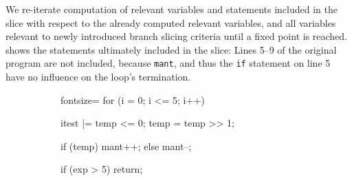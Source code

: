 \begin{example}
We re-iterate computation of relevant variables and statements included in the slice with respect to the already computed relevant variables, and all variables relevant to newly introduced branch slicing criteria until a fixed point is reached.  shows the statements ultimately included in the slice: Lines 5--9 of the original program are not included, because \texttt{mant}, and thus the \texttt{if} statement on line 5 have no influence on the loop's termination.
\end{example}

\begin{figure}
    \begin{subfigure}{.48\linewidth}
        \begin{ccode*}{fontsize=\small}
for (i = 0; i <= 5; i++) {
    itest |= temp <= 0;
    temp = temp >> 1;

    if (temp) {
        mant++;
    } else {
        mant--;
    }

    if (exp > 5)
        return;

}
\end{ccode*}
\end{subfigure}
\end{figure}
